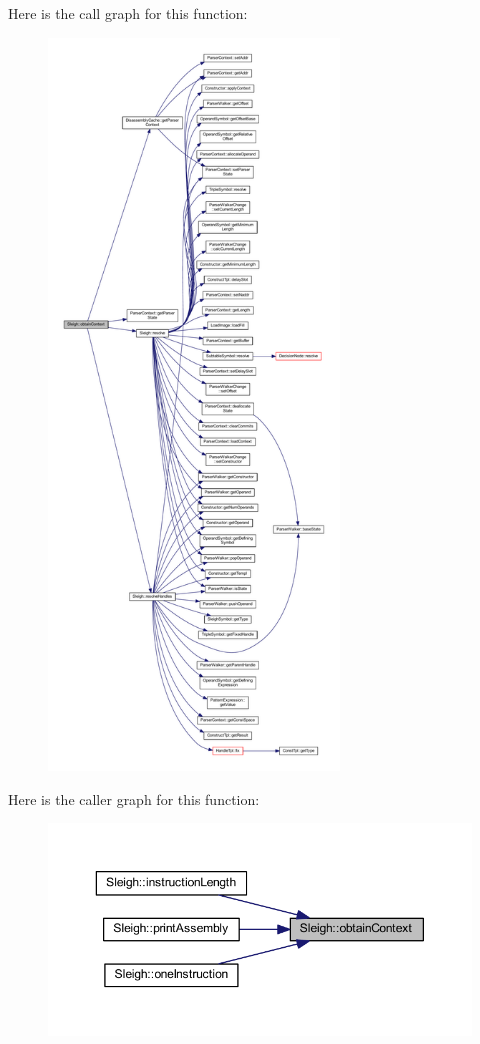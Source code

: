 Here is the call graph for this function\+:
\nopagebreak
\begin{figure}[H]
\begin{center}
\leavevmode
\includegraphics[height=550pt]{class_sleigh_abab71643681aaa776f4e4c5d643be3a3_cgraph}
\end{center}
\end{figure}
Here is the caller graph for this function\+:
\nopagebreak
\begin{figure}[H]
\begin{center}
\leavevmode
\includegraphics[width=350pt]{class_sleigh_abab71643681aaa776f4e4c5d643be3a3_icgraph}
\end{center}
\end{figure}
\mbox{\label{class_sleigh_a7221a746dae0e1acfd2189a192974fe0}} 
